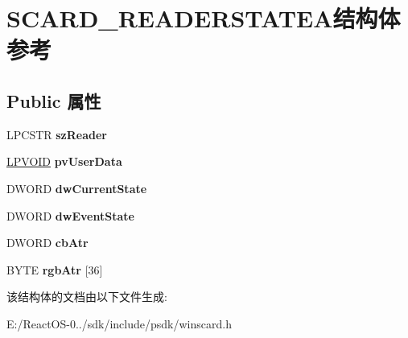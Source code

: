 \hypertarget{struct_s_c_a_r_d___r_e_a_d_e_r_s_t_a_t_e_a}{}\section{S\+C\+A\+R\+D\+\_\+\+R\+E\+A\+D\+E\+R\+S\+T\+A\+T\+E\+A结构体 参考}
\label{struct_s_c_a_r_d___r_e_a_d_e_r_s_t_a_t_e_a}
\subsection*{Public 属性}
\begin{DoxyCompactItemize}
\item 
\mbox{\label{struct_s_c_a_r_d___r_e_a_d_e_r_s_t_a_t_e_a_a363d175a97fba58bc03077e502307dd5}} 
L\+P\+C\+S\+TR {\bfseries sz\+Reader}
\item 
\mbox{\label{struct_s_c_a_r_d___r_e_a_d_e_r_s_t_a_t_e_a_a15f4a04129ca0a0975c46aa7a3879d50}} 
\hyperlink{interfacevoid}{L\+P\+V\+O\+ID} {\bfseries pv\+User\+Data}
\item 
\mbox{\label{struct_s_c_a_r_d___r_e_a_d_e_r_s_t_a_t_e_a_a6c413065e019b50d8d4ebed04cadec06}} 
D\+W\+O\+RD {\bfseries dw\+Current\+State}
\item 
\mbox{\label{struct_s_c_a_r_d___r_e_a_d_e_r_s_t_a_t_e_a_ae7657fafcba9fb25944f95253042d119}} 
D\+W\+O\+RD {\bfseries dw\+Event\+State}
\item 
\mbox{\label{struct_s_c_a_r_d___r_e_a_d_e_r_s_t_a_t_e_a_a97739e43d67cb2e3f6d8483ca76d1e08}} 
D\+W\+O\+RD {\bfseries cb\+Atr}
\item 
\mbox{\label{struct_s_c_a_r_d___r_e_a_d_e_r_s_t_a_t_e_a_a9e63859528652c99ceb3b75e28879547}} 
B\+Y\+TE {\bfseries rgb\+Atr} \mbox{[}36\mbox{]}
\end{DoxyCompactItemize}


该结构体的文档由以下文件生成\+:\begin{DoxyCompactItemize}
\item 
E\+:/\+React\+O\+S-\/0../sdk/include/psdk/winscard.\+h\end{DoxyCompactItemize}
